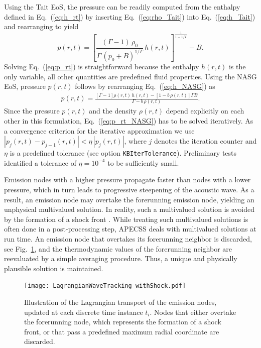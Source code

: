 Using the Tait EoS, the pressure can be readily computed from the enthalpy defined in Eq.~(\ref{eq:h_rt}) by inserting Eq.~(\ref{eq:rho_Tait}) into Eq.~(\ref{eq:h_Tait}) and rearranging to yield
\begin{equation}
    p(r,t) = \left[ \frac{(\Gamma-1) \, \rho_0}{\Gamma \, (p_0+B)^{1/\Gamma}} \, h(r,t) \right]^{\frac{1}{1-1/\Gamma}} - B. \label{eq:p_rt}
\end{equation}
Solving Eq.~(\ref{eq:p_rt}) is straightforward because the enthalpy $h(r,t)$ is the only variable, all other quantities are predefined fluid properties. Using the NASG EoS, pressure $p(r,t)$ follows by rearranging Eq.~(\ref{eq:h_NASG}) as
\begin{eqnarray}
p(r,t) = \frac{\left[\Gamma-1\right] \rho(r,t) \, h(r,t) - \left[1 - b \, \rho(r,t) \right] \Gamma B}{\Gamma - b \, \rho(r,t)}.  \label{eq:p_rt_NASG}
\end{eqnarray}
Since the pressure $p(r,t)$ and the density $\rho(r,t)$ depend explicitly on each other in this formulation, Eq.~(\ref{eq:p_rt_NASG}) has to be solved iteratively. As a convergence criterion for the iterative approximation we use $|p_j(r,t) - p_{j-1}(r,t)| < \eta \, |p_j(r,t)|$, where $j$ denotes the iteration counter and $\eta$ is a predefined tolerance (see option {\tt KBIterTolerance}). Preliminary tests identified a tolerance of $\eta = 10^{-4}$ to be sufficiently small.

Emission nodes with a higher pressure propagate faster than nodes with a lower pressure, which in turn leads to progressive steepening of the acoustic wave. As a result, an emission node may overtake the forerunning emission node, yielding an unphysical multivalued solution. In reality, such a multivalued solution is avoided by the formation of a shock front \citep{Fay1931}. While treating such multivalued solutions is often done in a post-processing step, APECSS deals with multivalued solutions at run time. An emission node that overtakes its forerunning neighbor is discarded, see Fig.~\ref{fig:lagrangiantrackingshock}, and the thermodynamic values of the forerunning neighbor are reevaluated by a simple averaging procedure. Thus, a unique and physically plausible solution is maintained.

\begin{figure}
    \begin{center}
    \texttt{[image: LagrangianWaveTracking\_withShock.pdf]}
    \caption{Illustration of the Lagrangian transport of the emission nodes, updated at each discrete time instance $t_i$. Nodes that either overtake the forerunning node, which represents the formation of a shock front, or that pass a predefined maximum radial coordinate are discarded.}
    \label{fig:lagrangiantrackingshock}
    \end{center}
\end{figure}


